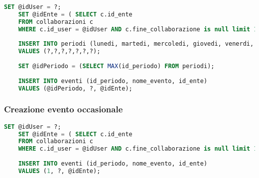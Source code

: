 \begin{lstlisting}[language=SQL]
	SET @idUser = ?;
	SET @idEnte = ( SELECT c.id_ente
	FROM collaborazioni c
	WHERE c.id_user = @idUser AND c.fine_collaborazione is null limit 1);
	
	INSERT INTO periodi (lunedi, martedi, mercoledi, giovedi, venerdi, sabato, domenica) 
	VALUES (?,?,?,?,?,?,?);
	
	SET @idPeriodo = (SELECT MAX(id_periodo) FROM periodi);
	
	INSERT INTO eventi (id_periodo, nome_evento, id_ente) 
	VALUES (@idPeriodo, ?, @idEnte);
\end{lstlisting}


\subsubsection{Creazione evento occasionale}
\begin{lstlisting}[language=SQL]
	SET @idUser = ?;
	SET @idEnte = ( SELECT c.id_ente
	FROM collaborazioni c
	WHERE c.id_user = @idUser AND c.fine_collaborazione is null limit 1);
	
	INSERT INTO eventi (id_periodo, nome_evento, id_ente) 
	VALUES (1, ?, @idEnte);
\end{lstlisting}